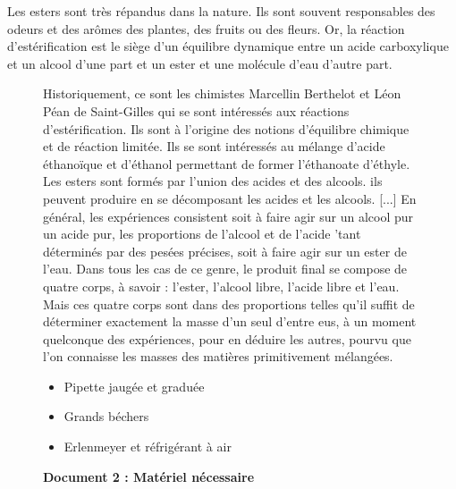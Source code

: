 \documentclass[a4paper,11pt,fleqn]{article}%
\begin{document}
	\maketitle
	
Les esters sont très répandus dans la nature. Ils sont souvent responsables des odeurs et des arômes des plantes, des fruits ou des fleurs. Or, la réaction d'estérification est le siège d'un équilibre dynamique entre un acide carboxylique et un alcool d'une part et un ester et une molécule d'eau d'autre part.

\begin{figure}[h!]
    \begin{minipage}{.5\linewidth}
    \caption*{\textbf{Document 1 : Réaction d'estérification}}
    Historiquement, ce sont les chimistes Marcellin Berthelot et Léon Péan de Saint-Gilles qui se sont intéressés aux réactions d'estérification. Ils sont à l'origine des notions d'équilibre chimique et de réaction limitée. Ils se sont intéressés au mélange d'acide éthanoïque et d'éthanol permettant de former l'éthanoate d'éthyle.\\
    Les esters sont formés par l'union des acides et des alcools. ils peuvent produire en se décomposant les acides et les alcools. [...] En général, les expériences consistent soit à faire agir sur un alcool pur un acide pur, les proportions de l'alcool et de l'acide 'tant déterminés par des pesées précises, soit à faire agir sur un ester de l'eau. Dans tous les cas de ce genre, le produit final se compose de quatre corps, à savoir : l'ester, l'alcool libre, l'acide libre et l'eau. Mais ces quatre corps sont dans des proportions telles qu'il suffit de déterminer exactement la masse d'un seul d'entre eus, à un moment quelconque des expériences, pour en déduire les autres, pourvu que l'on connaisse les masses des  matières primitivement mélangées.\\
    \label{fig:doc1}
    \end{minipage}
    \begin{minipage}{.5\linewidth}
    \caption*{\textbf{Document 2 : Matériel nécessaire}}
    \begin{itemize}
        \item Pipette jaugée et graduée
        \item Grands béchers
        \item Erlenmeyer et réfrigérant à air

\end{itemize}
\end{minipage}
\end{figure}
\end{document}
